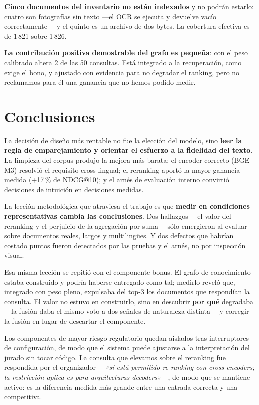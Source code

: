 \documentclass[10pt,a4paper]{article}
\begin{document}
\textbf{Cinco documentos del inventario no están indexados} y no podrán estarlo: cuatro son
fotografías sin texto —el OCR se ejecuta y devuelve vacío correctamente— y el quinto es un archivo
de dos bytes. La cobertura efectiva es de 1\,821 sobre 1\,826.

\textbf{La contribución positiva demostrable del grafo es pequeña}: con el peso calibrado altera 2
de las 50 consultas. Está integrado a la recuperación, como exige el bono, y ajustado con evidencia
para no degradar el ranking, pero no reclamamos para él una ganancia que no hemos podido medir.

\section{Conclusiones}

La decisión de diseño más rentable no fue la elección del modelo, sino \textbf{leer la regla de
emparejamiento y orientar el esfuerzo a la fidelidad del texto}. La limpieza del corpus produjo la
mejora más barata; el encoder correcto (BGE-M3) resolvió el requisito cross-lingual; el reranking
aportó la mayor ganancia medida (+17\,\% de NDCG@10); y el arnés de evaluación interno convirtió
decisiones de intuición en decisiones medidas.

La lección metodológica que atraviesa el trabajo es que \textbf{medir en condiciones
representativas cambia las conclusiones}. Dos hallazgos —el valor del reranking y el perjuicio de
la agregación por suma— sólo emergieron al evaluar sobre documentos reales, largos y multilingües.
Y dos defectos que habrían costado puntos fueron detectados por las pruebas y el arnés, no por
inspección visual.

Esa misma lección se repitió con el componente bonus. El grafo de conocimiento estaba construido y
podría haberse entregado como tal; medirlo reveló que, integrado con peso pleno, expulsaba del
top-3 los documentos que respondían la consulta. El valor no estuvo en construirlo, sino en
descubrir \textbf{por qué} degradaba —la fusión daba el mismo voto a dos señales de naturaleza
distinta— y corregir la fusión en lugar de descartar el componente.

Los componentes de mayor riesgo regulatorio quedan aislados tras interruptores de configuración,
de modo que el sistema puede ajustarse a la interpretación del jurado sin tocar código. La consulta
que elevamos sobre el reranking fue respondida por el organizador —\emph{«sí está permitido
re-ranking con cross-encoders; la restricción aplica es para arquitecturas decoders»}—, de modo que
se mantiene activo: es la diferencia medida más grande entre una entrada correcta y una
competitiva.
\end{document}
